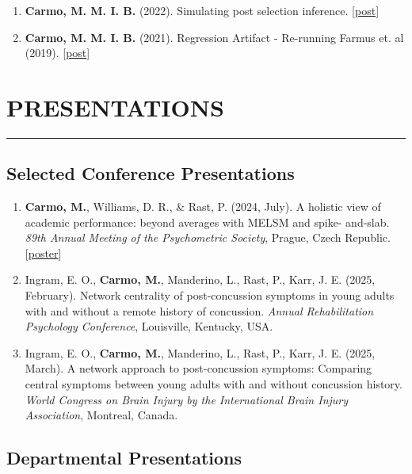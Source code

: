 \documentclass[10pt,]{article}
\begin{document}
\begin{enumerate}
\def\labelenumi{\arabic{enumi}.}
\item
  \textbf{Carmo, M. M. I. B.} (2022). Simulating post selection
  inference.
  {[}\href{https://marwincarmo.github.io/posts/2021-12-20-model-selection-bias/}{post}{]}
\item
  \textbf{Carmo, M. M. I. B.} (2021). Regression Artifact - Re-running
  Farmus et. al (2019).
  {[}\href{https://marwincarmo.github.io/posts/2021-11-04-simulating-regression-artifact/}{post}{]}
\end{enumerate}

\section{PRESENTATIONS}\label{presentations}

\hrule

\subsection{\texorpdfstring{\textbf{Selected Conference
Presentations}}{Selected Conference Presentations}}\label{selected-conference-presentations}

\begin{enumerate}
\def\labelenumi{\arabic{enumi}.}
\item
  \textbf{Carmo, M.}, Williams, D. R., \& Rast, P. (2024, July). A
  holistic view of academic performance: beyond averages with MELSM and
  spike- and-slab. \emph{89th Annual Meeting of the Psychometric
  Society}, Prague, Czech Republic.
  {[}\href{https://marwincarmo.github.io/posters/imps24}{poster}{]}
\item
  Ingram, E. O., \textbf{Carmo, M.}, Manderino, L., Rast, P., Karr, J.
  E. (2025, February). Network centrality of post-concussion symptoms in
  young adults with and without a remote history of concussion.
  \emph{Annual Rehabilitation Psychology Conference}, Louisville,
  Kentucky, USA.
\item
  Ingram, E. O., \textbf{Carmo, M.}, Manderino, L., Rast, P., Karr, J.
  E. (2025, March). A network approach to post-concussion symptoms:
  Comparing central symptoms between young adults with and without
  concussion history. \emph{World Congress on Brain Injury by the
  International Brain Injury Association}, Montreal, Canada.
\end{enumerate}

\subsection{\texorpdfstring{\textbf{Departmental
Presentations}}{Departmental Presentations}}\label{departmental-presentations}
\end{document}
